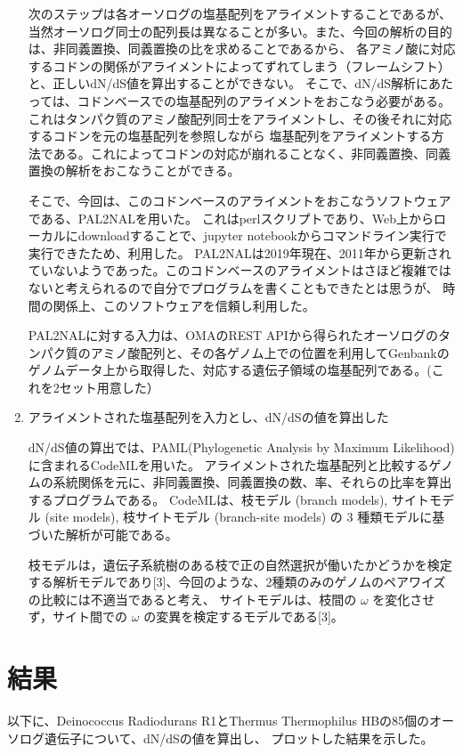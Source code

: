 \documentclass[a4j,12pt]{jreport}
\begin{document}
\begin{enumerate}
        次のステップは各オーソログの塩基配列をアライメントすることであるが、当然オーソログ同士の配列長は異なることが多い。また、今回の解析の目的は、非同義置換、同義置換の比を求めることであるから、
        各アミノ酸に対応するコドンの関係がアライメントによってずれてしまう（フレームシフト）と、正しいdN/dS値を算出することができない。
        そこで、dN/dS解析にあたっては、コドンベースでの塩基配列のアライメントをおこなう必要がある。これはタンパク質のアミノ酸配列同士をアライメントし、その後それに対応するコドンを元の塩基配列を参照しながら
        塩基配列をアライメントする方法である。これによってコドンの対応が崩れることなく、非同義置換、同義置換の解析をおこなうことができる。
        
        そこで、今回は、このコドンベースのアライメントをおこなうソフトウェアである、PAL2NALを用いた。
        これはperlスクリプトであり、Web上からローカルにdownloadすることで、jupyter notebookからコマンドライン実行で実行できたため、利用した。
        PAL2NALは2019年現在、2011年から更新されていないようであった。このコドンベースのアライメントはさほど複雑ではないと考えられるので自分でプログラムを書くこともできたとは思うが、
        時間の関係上、このソフトウェアを信頼し利用した。
        
        PAL2NALに対する入力は、OMAのREST APIから得られたオーソログのタンパク質のアミノ酸配列と、その各ゲノム上での位置を利用してGenbankのゲノムデータ上から取得した、対応する遺伝子領域の塩基配列である。(これを2セット用意した）

        \item アライメントされた塩基配列を入力とし、dN/dSの値を算出した
        
        dN/dS値の算出では、PAML(Phylogenetic Analysis by Maximum Likelihood) に含まれるCodeMLを用いた。
        アライメントされた塩基配列と比較するゲノムの系統関係を元に、非同義置換、同義置換の数、率、それらの比率を算出するプログラムである。
        CodeMLは、枝モデル (branch models), サイトモデル (site models), 枝サイトモデル (branch-site models) の 3 種類モデルに基づいた解析が可能である。

        枝モデルは，遺伝子系統樹のある枝で正の自然選択が働いたかどうかを検定する解析モデルであり[3]、今回のような、2種類のみのゲノムのペアワイズの比較には不適当であると考え、
        サイトモデルは、枝間の $\omega$ を変化させず，サイト間での $\omega$ の変異を検定するモデルである[3]。

    \end{enumerate}



\section{結果}
以下に、Deinococcus Radiodurans R1とThermus Thermophilus HBの85個のオーソログ遺伝子について、dN/dSの値を算出し、
プロットした結果を示した。
\end{document}
